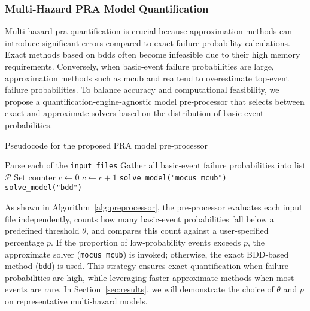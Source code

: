 \subsubsection{Multi‑Hazard PRA Model Quantification}
\label{sec:multi_hazard_quantification}

Multi‑hazard \acrshort{pra} quantification is crucial because approximation methods can introduce significant errors compared to exact failure‐probability calculations. Exact methods based on \acrshort{bdd}s often become infeasible due to their high memory requirements. Conversely, when basic‐event failure probabilities are large, approximation methods such as \acrshort{mcub} and \acrshort{rea} tend to overestimate top‐event failure probabilities. To balance accuracy and computational feasibility, we propose a quantification‐engine‑agnostic model pre‐processor that selects between exact and approximate solvers based on the distribution of basic‐event probabilities.

\begin{algorithm}[htbp]
\caption{Pseudocode for the proposed PRA model pre‐processor}
\label{alg:preprocessor}
\begin{algorithmic}[1]
\State Parse each of the \texttt{input\_files}
\State Gather all basic‐event failure probabilities into list $\mathcal{P}$
\State Set counter $c \leftarrow 0$
\State $c \leftarrow c + 1$
\EndIf
\EndFor
{}
\State \texttt{solve\_model("mocus mcub")}
\Else
\State \texttt{solve\_model("bdd")}
\EndIf
\EndProcedure
\end{algorithmic}
\end{algorithm}

As shown in Algorithm~\ref{alg:preprocessor}, the pre‐processor evaluates each input file independently, counts how many basic‐event probabilities fall below a predefined threshold $\theta$, and compares this count against a user‐specified percentage $p$. If the proportion of low‐probability events exceeds $p$, the approximate solver (\texttt{mocus mcub}) is invoked; otherwise, the exact BDD‑based method (\texttt{bdd}) is used. This strategy ensures exact quantification when failure probabilities are high, while leveraging faster approximate methods when most events are rare. In Section~\ref{sec:results}, we will demonstrate the choice of $\theta$ and $p$ on representative multi‑hazard models.